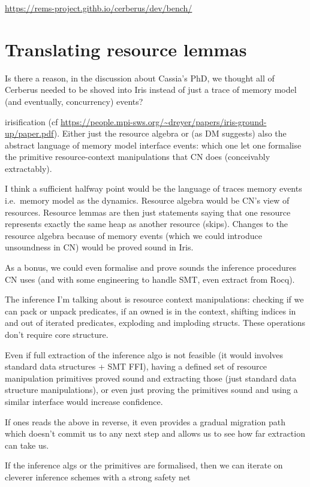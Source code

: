 \url{https://rems-project.githb.io/cerberus/dev/bench/}

\section{Translating resource lemmas}\label{sec:trans-res-lemmas}

Is there a reason, in the discussion about Cassia's PhD, we thought all of
Cerberus needed to be shoved into Iris instead of just a trace of memory model
(and eventually, concurrency) events?

irisification (cf
\url{https://people.mpi-sws.org/~dreyer/papers/iris-ground-up/paper.pdf}).  Either
just the resource algebra or (as DM suggests) also the abstract language of
memory model interface events: which one let one formalise the primitive
resource-context manipulations that CN does (conceivably extractably).

I think a sufficient halfway point would be the language of traces memory
events i.e.\ memory model as the dynamics. Resource algebra would be CN's view
of resources. Resource lemmas are then just statements saying that one resource
represents exactly the same heap as another resource (skips). Changes to the
resource algebra because of memory events (which we could introduce unsoundness
in CN) would be proved sound in Iris.

As a bonus, we could even formalise and prove sounds the inference procedures
CN uses (and with some engineering to handle SMT, even extract from Rocq).

The inference I'm talking about is resource context manipulations: checking if
we can pack or unpack predicates, if an owned is in the context, shifting
indices in and out of iterated predicates, exploding and imploding structs.
These operations don't require core structure.

Even if full extraction of the inference algo is not feasible (it would
involves standard data structures + SMT FFI), having a defined set of resource
manipulation primitives proved sound and extracting those (just standard data
structure manipulations), or even just proving the primitives sound and using a
similar interface would increase confidence.

If ones reads the above in reverse, it even provides a gradual migration path
which doesn't commit us to any next step and allows us to see how far
extraction can take us.

If the inference algs or the primitives are formalised, then we can iterate on
cleverer  inference schemes with a strong safety net

